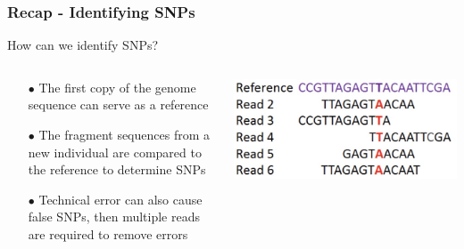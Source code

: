 \documentclass[xcolor=dvipsnames]{beamer}
\begin{document}
\begin{frame}
       \frametitle{Recap - Identifying SNPs}
       
       \centering How can we identify SNPs?\\
       
       \vspace{20pt}
       
      \begin{columns}
               \begin{column}{0.5\textwidth}
                       
                       \begin{itemize}
                               \item[$\bullet$] The first copy of the genome sequence can serve as a reference
                               \item[$\bullet$] The fragment sequences from a new individual are compared to the reference to determine SNPs
                               \item[$\bullet$] Technical error can also cause  false SNPs, then multiple reads are required to remove errors
                               
                       \end{itemize}
               \end{column}
               \begin{column}{0.5\textwidth}
                       \includegraphics[keepaspectratio, width  = \textwidth]{img/readDiagram}
               \end{column}
       \end{columns}


\end{frame}
\end{document}
